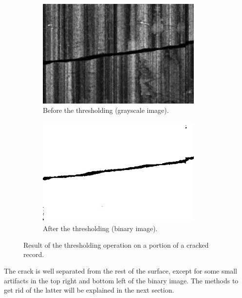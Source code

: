 \begin{figure}[!ht]
\centering
    \begin{subfigure}[t]{0.45\textwidth}
    \centering
    \includegraphics[width=0.9\textwidth]{images/thresh-before}
    \caption{Before the thresholding (grayscale image).}
    \label{fig:threshbef}
    \end{subfigure}
    \begin{subfigure}[t]{0.45\textwidth}
    \centering
    \includegraphics[width=0.9\textwidth]{images/thresh-after}
    \caption{After the thresholding (binary image).}
    \label{fig:threshaft}
    \end{subfigure}
    \caption{Result of the thresholding operation on a portion of a cracked record.}
    \label{fig:threshex}
\end{figure}

The crack is well separated from the rest of the surface, except for some small artifacts in the top right and bottom left of the binary image. The methods to get rid of the latter will be explained in the next section.

